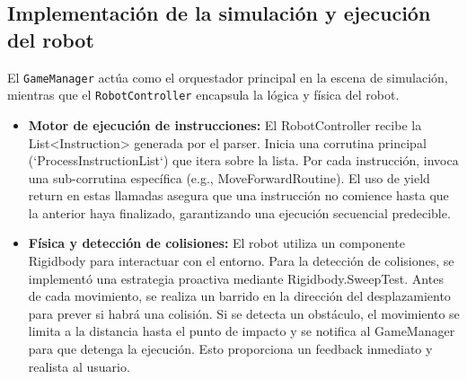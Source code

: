 \subsection{Implementación de la simulación y ejecución del robot}
El \texttt{GameManager} actúa como el orquestador principal en la escena de simulación, mientras que el \texttt{RobotController} encapsula la lógica y física del robot.
\begin{itemize}
	\item \textbf{Motor de ejecución de instrucciones:} El RobotController recibe la List<Instruction> generada por el parser. Inicia una corrutina principal (`ProcessInstructionList`) que itera sobre la lista. Por cada instrucción, invoca una sub-corrutina específica (e.g., MoveForwardRoutine). El uso de yield return en estas llamadas asegura que una instrucción no comience hasta que la anterior haya finalizado, garantizando una ejecución secuencial predecible.
	\item \textbf{Física y detección de colisiones:} El robot utiliza un componente Rigidbody para interactuar con el entorno. Para la detección de colisiones, se implementó una estrategia proactiva mediante Rigidbody.SweepTest. Antes de cada movimiento, se realiza un barrido en la dirección del desplazamiento para prever si habrá una colisión. Si se detecta un obstáculo, el movimiento se limita a la distancia hasta el punto de impacto y se notifica al GameManager para que detenga la ejecución. Esto proporciona un feedback inmediato y realista al usuario.
\end{itemize}
